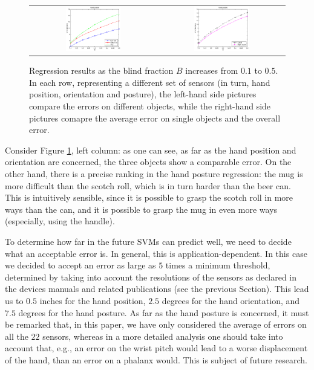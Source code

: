 \begin{figure}[htbp]
\begin{center}
\begin{tabular}{cc}
      \includegraphics[width=0.45\textwidth]{error_pst.eps} &
      \includegraphics[width=0.45\textwidth]{error_cmp_pst.eps} \\
    \end{tabular}
    \caption{Regression results as the blind fraction $B$ increases
    from $0.1$ to $0.5$. In each row, representing a different set of
    sensors (in turn, hand position, orientation and posture), the
    left-hand side pictures compare the errors on different objects,
    while the right-hand side pictures comapre the average error on
    single objects and the overall error.}
    \label{fig:err_all}
  \end{center}
\end{figure}

Consider Figure \ref{fig:err_all}, left column: as one can see, as far
as the hand position and orientation are concerned, the three objects
show a comparable error. On the other hand, there is a precise ranking
in the hand posture regression: the mug is more difficult than the
scotch roll, which is in turn harder than the beer can. This is
intuitively sensible, since it is possible to grasp the scotch roll in
more ways than the can, and it is possible to grasp the mug in even
more ways (especially, using the handle).

To determine how far in the future SVMs can predict well, we need to
decide what an acceptable error is. In general, this is
application-dependent. In this case we decided to accept an error as
large as $5$ times a minimum threshold, determined by taking into
account the resolutions of the sensors as declared in the devices
manuals and related publications (see the previous Section). This lead
us to $0.5$ inches for the hand position, $2.5$ degrees for the hand
orientation, and $7.5$ degrees for the hand posture. As far as the
hand posture is concerned, it must be remarked that, in this paper, we
have only considered the average of errors on all the $22$ sensors,
whereas in a more detailed analysis one should take into account that,
e.g., an error on the wrist pitch would lead to a worse displacement
of the hand, than an error on a phalanx would. This is subject of
future research.

